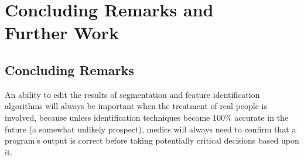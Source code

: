 \chapter[Concluding Remarks and Further Work]{Concluding Remarks and\\Further Work}
\label{chap:conclusions}

\section{Concluding Remarks}

An ability to edit the results of segmentation and feature identification algorithms will always be important when the treatment of real people is involved, because unless identification techniques become $100\%$ accurate in the future (a somewhat unlikely prospect), medics will always need to confirm that a program's output is correct before taking potentially critical decisions based upon it.

